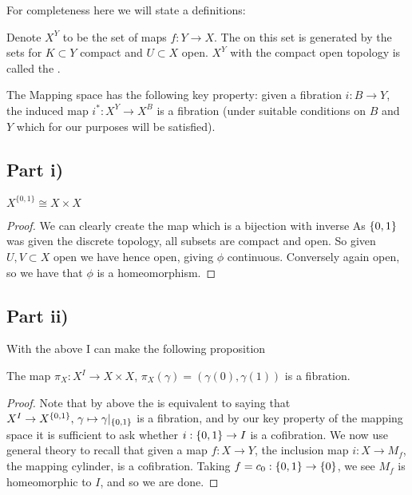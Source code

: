 \documentclass{article}
\begin{document}
For completeness here we will state a definitions:

\begin{definition}
Denote $X^Y$ to be the set of maps $f:Y \to X$. The  on this set is generated by the sets 
for $K \subset Y$ compact and $U \subset X$ open. $X^Y$ with the compact open topology is called the . 
\end{definition}

The Mapping space has the following key property: given a fibration $i : B \to Y$, the induced map $i^\ast : X^Y \to X^B$ is a fibration (under suitable conditions on $B$ and $Y$ which for our purposes will be satisfied). 


\subsection{Part i)}
\begin{lemma}
$X^{\{0,1\}} \cong X \times X$
\end{lemma}
\begin{proof}
We can clearly create the map
which is a bijection with inverse 
As $\left\{ 0,1 \right\}$ was given the discrete topology, all subsets are compact and open. So given $U,V \subset X$ open we have 
hence open, giving $\phi$ continuous. Conversely
again open, so we have that $\phi$ is a homeomorphism. 
\end{proof}

\subsection{Part ii)}
With the above I can make the following proposition
\begin{prop}
The map $\pi_X : X^I \to X \times X$, $\pi_X(\gamma) = (\gamma(0),\gamma(1))$ is a fibration.  
\end{prop}
\begin{proof}
Note that by above the is equivalent to saying that $X^I \to X^{\left\{ 0,1 \right\}}, \, \gamma \mapsto \gamma\rvert_{\left\{ 0,1 \right\}}$ is a fibration, and by our key property of the mapping space it is sufficient to ask whether $i:\left\{ 0,1 \right\} \to I$ is a cofibration. We now use general theory to recall that given a map $f:X \to Y$, the inclusion map $i:X \to M_f$, the mapping cylinder, is a cofibration.  Taking $f = c_0 :\left\{ 0,1 \right\} \to \left\{ 0 \right\}$, we see $M_f$ is homeomorphic to $I$, and so we are done. 
\end{proof}
\end{document}
